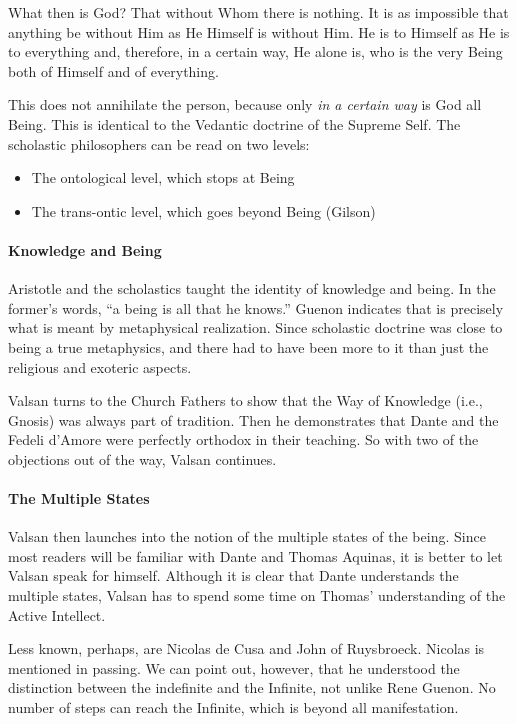 \begin{quotex}
What then is God? That without Whom there is nothing. It is as impossible that anything be without Him as He Himself is without Him. He is to Himself as He is to everything and, therefore, in a certain way, He alone is, who is the very Being both of Himself and of everything. 

\end{quotex}
This does not annihilate the person, because only \emph{in a certain way} is God all Being. This is identical to the Vedantic doctrine of the Supreme Self. The scholastic philosophers can be read on two levels:

\begin{itemize}
\item The ontological level, which stops at Being 
\item The trans-ontic level, which goes beyond Being (Gilson) 
\end{itemize}
\paragraph{Knowledge and Being}
Aristotle and the scholastics taught the identity of knowledge and being. In the former's words, “a being is all that he knows.” Guenon indicates that is precisely what is meant by metaphysical realization. Since scholastic doctrine was close to being a true metaphysics, and there had to have been more to it than just the religious and exoteric aspects.

Valsan turns to the Church Fathers to show that the Way of Knowledge (i.e., Gnosis) was always part of tradition. Then he demonstrates that Dante and the Fedeli d'Amore were perfectly orthodox in their teaching. So with two of the objections out of the way, Valsan continues.

\paragraph{The Multiple States}
Valsan then launches into the notion of the multiple states of the being. Since most readers will be familiar with Dante and Thomas Aquinas, it is better to let Valsan speak for himself. Although it is clear that Dante understands the multiple states, Valsan has to spend some time on Thomas' understanding of the Active Intellect.

Less known, perhaps, are Nicolas de Cusa and John of Ruysbroeck. Nicolas is mentioned in passing. We can point out, however, that he understood the distinction between the indefinite and the Infinite, not unlike Rene Guenon. No number of steps can reach the Infinite, which is beyond all manifestation.

